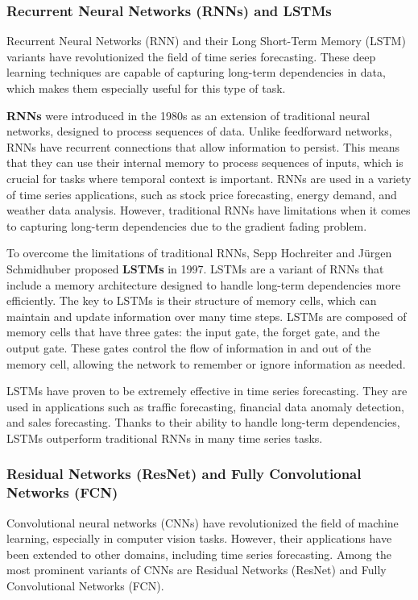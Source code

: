 \subsubsection{Recurrent Neural Networks (RNNs) and LSTMs}
Recurrent Neural Networks (RNN) and their Long Short-Term Memory (LSTM) variants have revolutionized the field of time series forecasting. These deep learning techniques are capable of capturing long-term dependencies in data, which makes them especially useful for this type of task.
\vspace{10pt}

\textbf{RNNs} were introduced in the 1980s as an extension of traditional neural networks, designed to process sequences of data. Unlike feedforward networks, RNNs have recurrent connections that allow information to persist. This means that they can use their internal memory to process sequences of inputs, which is crucial for tasks where temporal context is important.
RNNs are used in a variety of time series applications, such as stock price forecasting, energy demand, and weather data analysis. However, traditional RNNs have limitations when it comes to capturing long-term dependencies due to the gradient fading problem.
\vspace{10pt}

To overcome the limitations of traditional RNNs, Sepp Hochreiter and Jürgen Schmidhuber proposed \textbf{LSTMs} in 1997\cite{LSTM}. LSTMs are a variant of RNNs that include a memory architecture designed to handle long-term dependencies more efficiently. The key to LSTMs is their structure of memory cells, which can maintain and update information over many time steps. LSTMs are composed of memory cells that have three gates: the input gate, the forget gate, and the output gate. These gates control the flow of information in and out of the memory cell, allowing the network to remember or ignore information as needed.

LSTMs have proven to be extremely effective in time series forecasting. They are used in applications such as traffic forecasting, financial data anomaly detection, and sales forecasting. Thanks to their ability to handle long-term dependencies, LSTMs outperform traditional RNNs in many time series tasks.
\vspace{10pt}

\subsubsection{Residual Networks (ResNet) and Fully Convolutional Networks (FCN)}
Convolutional neural networks (CNNs) have revolutionized the field of machine learning, especially in computer vision tasks. However, their applications have been extended to other domains, including time series forecasting. Among the most prominent variants of CNNs are Residual Networks (ResNet) and Fully Convolutional Networks (FCN).

